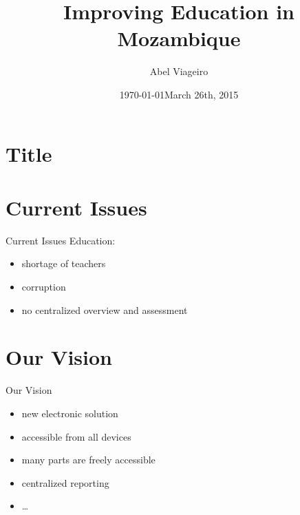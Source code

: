 \documentclass{beamer}
\begin{document}
\section{Title}
\title{Improving Education in Mozambique}
\author{Abel Viageiro}
\date{\today}
\date{March 26th, 2015}
\maketitle



\section{Current Issues}
\begin{frame}{Current Issues}
  Education:
  \medskip
  \begin{itemize}
\item shortage of teachers

\item corruption

\item no centralized overview and assessment

  \end{itemize}

\end{frame}

\section{Our Vision}
\begin{frame}{Our Vision}
  \begin{itemize}
  \item new electronic solution
  \item accessible from all devices
  \item many parts are freely accessible
  \item centralized reporting
  \item \dots
  \end{itemize}
\end{frame}
\end{document}
